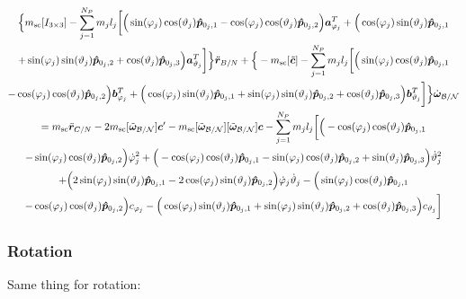 \begin{multline}
	\Big\{m_{\text{sc}}[I_{3\times3}] -\sum_{j=1}^{N_{P}}m_j l_j \bigg[
	\Big(\sin(\varphi_j)\cos(\vartheta_j)\bm{\hat{p}}_{0_j,1}-\cos(\varphi_j)\cos(\vartheta_j)\bm{\hat{p}}_{0_j,2}\Big)\bm a_{\varphi_j}^T +\Big(\cos(\varphi_j)\sin(\vartheta_j)\bm{\hat{p}}_{0_j,1}\\+\sin(\varphi_j)\sin(\vartheta_j)\bm{\hat{p}}_{0_j,2}+\cos(\vartheta_j)\bm{\hat{p}}_{0_j,3}\Big)\bm a_{\vartheta_j}^T \bigg]\Big\}\ddot{\bm r}_{B/N}
	+\Big\{-m_{\text{sc}}[\tilde{\bm{c}}] -\sum_{j=1}^{N_{P}}m_j l_j \bigg[
	\Big(\sin(\varphi_j)\cos(\vartheta_j)\bm{\hat{p}}_{0_j,1}\\-\cos(\varphi_j)\cos(\vartheta_j)\bm{\hat{p}}_{0_j,2}\Big)\bm b_{\varphi_j}^T +\Big(\cos(\varphi_j)\sin(\vartheta_j)\bm{\hat{p}}_{0_j,1}+\sin(\varphi_j)\sin(\vartheta_j)\bm{\hat{p}}_{0_j,2}+\cos(\vartheta_j)\bm{\hat{p}}_{0_j,3}\Big)\bm b_{\vartheta_j}^T \bigg] \Big\}\dot{\bm\omega}_{\cal B/N}
	\\= m_{\text{sc}}\ddot{\bm r}_{C/N} - 2m_{\text{sc}}[\tilde{\bm\omega}_{\cal B/N}] \bm c'
	-m_{\text{sc}}[\tilde{\bm\omega}_{\cal B/N}][\tilde{\bm\omega}_{\cal B/N}]\bm{c}
	-\sum_{j=1}^{N_{P}}m_j l_j \bigg[ 
	\Big(-\cos(\varphi_j)\cos(\vartheta_j)\bm{\hat{p}}_{0_j,1}\\-\sin(\varphi_j)\cos(\vartheta_j)\bm{\hat{p}}_{0_j,2}\Big)\dot{\varphi}_j^2
	+\Big(-\cos(\varphi_j)\cos(\vartheta_j)\bm{\hat{p}}_{0_j,1}-\sin(\varphi_j)\cos(\vartheta_j)\bm{\hat{p}}_{0_j,2}+\sin(\vartheta_j)\bm{\hat{p}}_{0_j,3} \Big)\dot{\vartheta}_j^2 \\+
	\Big(2\sin(\varphi_j)\sin(\vartheta_j)\bm{\hat{p}}_{0_j,1} -2\cos(\varphi_j)\sin(\vartheta_j)\bm{\hat{p}}_{0_j,2}\Big)\dot{\varphi}_j\dot{\vartheta}_j
	-\Big(\sin(\varphi_j)\cos(\vartheta_j)\bm{\hat{p}}_{0_j,1}\\-\cos(\varphi_j)\cos(\vartheta_j)\bm{\hat{p}}_{0_j,2}\Big)c_{\varphi_j} - \Big(\cos(\varphi_j)\sin(\vartheta_j)\bm{\hat{p}}_{0_j,1}+\sin(\varphi_j)\sin(\vartheta_j)\bm{\hat{p}}_{0_j,2}+\cos(\vartheta_j)\bm{\hat{p}}_{0_j,3}\Big) c_{\vartheta_j} 
	\bigg]
	\label{eq:Rbddot7}
\end{multline}

\subsubsection{Rotation}

Same thing for rotation: 

